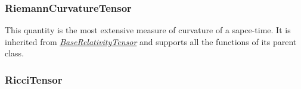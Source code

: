 \documentclass{aastex63}
\begin{document}



\subsubsection{RiemannCurvatureTensor}\label{subsubsec:riemann}

This quantity is the most extensive measure of curvature of a sapce-time. It is inherited from \hyperref[subsec:BaseRelativityTensor]{\textit{BaseRelativityTensor}} and supports all the functions of its parent class. 




\subsubsection{RicciTensor}\label{subsubsec:riccitensor}
\end{document}
